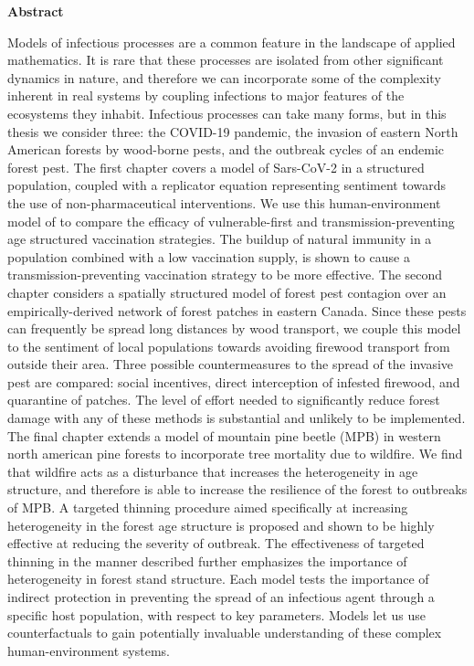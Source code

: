 
\begin{center}\textbf{Abstract}\end{center}


Models of infectious processes are a common feature in the landscape of applied mathematics. It is rare that these processes are isolated from other significant dynamics in nature, and therefore we can incorporate some of the complexity inherent in real systems by coupling infections to major features of the ecosystems they inhabit. Infectious processes can take many forms, but in this thesis we consider three: the COVID-19 pandemic, the invasion of eastern North American forests by wood-borne pests, and the outbreak cycles of an endemic forest pest. The first chapter covers a model of Sars-CoV-2 in a structured population, coupled with a replicator equation representing sentiment towards the use of non-pharmaceutical interventions. We use this human-environment model of to compare the efficacy of vulnerable-first and transmission-preventing age structured vaccination strategies. The buildup of natural immunity in a population combined with a low vaccination supply, is shown to cause a transmission-preventing vaccination strategy to be more effective. The second chapter considers a spatially structured model of forest pest contagion over an empirically-derived network of forest patches in eastern Canada. Since these pests can frequently be spread long distances by wood transport, we couple this model to the sentiment of local populations towards avoiding firewood transport from outside their area. Three possible countermeasures to the spread of the invasive pest are compared: social incentives, direct interception of infested firewood, and quarantine of patches. The level of effort needed to significantly reduce forest damage with any of these methods is substantial and unlikely to be implemented. The final chapter extends a model of mountain pine beetle (MPB) in western north american pine forests to incorporate tree mortality due to wildfire. We find that wildfire acts as a disturbance that increases the heterogeneity in age structure, and therefore is able to increase the resilience of the forest to outbreaks of MPB. A targeted thinning procedure aimed specifically at increasing heterogeneity in the forest age structure is proposed and shown to be highly effective at reducing the severity of outbreak. The effectiveness of targeted thinning in the manner described further emphasizes the importance of heterogeneity in forest stand structure. Each model tests the importance of indirect protection in preventing the spread of an infectious agent through a specific host population, with respect to key parameters. Models let us use counterfactuals to gain potentially invaluable understanding of these complex human-environment systems.



